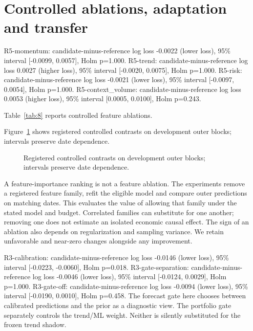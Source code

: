 \section{Controlled ablations, adaptation and transfer}\label{sec:section-07}

R5-momentum: candidate-minus-reference log loss -0.0022 (lower loss), 95\% interval [-0.0099, 0.0057], Holm p=1.000. R5-trend: candidate-minus-reference log loss 0.0027 (higher loss), 95\% interval [-0.0020, 0.0075], Holm p=1.000. R5-risk: candidate-minus-reference log loss -0.0021 (lower loss), 95\% interval [-0.0097, 0.0054], Holm p=1.000. R5-context\_volume: candidate-minus-reference log loss 0.0053 (higher loss), 95\% interval [0.0005, 0.0100], Holm p=0.243.

\noindent Table~\ref{tab:8} reports controlled feature ablations.



\noindent Figure~\ref{fig:7} shows registered controlled contrasts on development outer blocks; intervals preserve date dependence.

\begin{figure}[htbp]\centering

\caption{Registered controlled contrasts on development outer blocks; intervals preserve date dependence.}\label{fig:7}
\end{figure}

A feature-importance ranking is not a feature ablation. The experiments remove a registered feature family, refit the eligible model and compare outer predictions on matching dates. This evaluates the value of allowing that family under the stated model and budget. Correlated families can substitute for one another; removing one does not estimate an isolated economic causal effect. The sign of an ablation also depends on regularization and sampling variance. We retain unfavorable and near-zero changes alongside any improvement.

R3-calibration: candidate-minus-reference log loss -0.0146 (lower loss), 95\% interval [-0.0223, -0.0060], Holm p=0.018. R3-gate-separation: candidate-minus-reference log loss -0.0046 (lower loss), 95\% interval [-0.0124, 0.0029], Holm p=1.000. R3-gate-off: candidate-minus-reference log loss -0.0094 (lower loss), 95\% interval [-0.0190, 0.0010], Holm p=0.458. The forecast gate here chooses between calibrated predictions and the prior as a diagnostic view. The portfolio gate separately controls the trend/ML weight. Neither is silently substituted for the frozen trend shadow.

